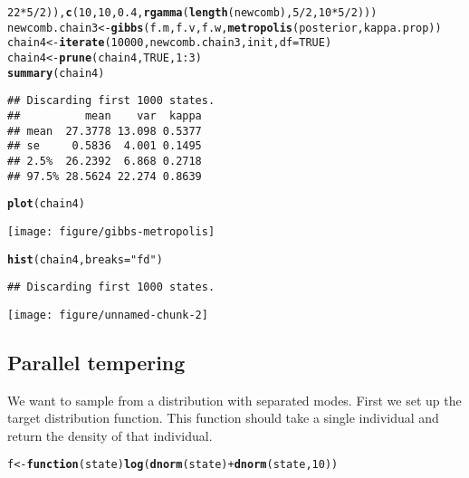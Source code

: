 \documentclass{article}\usepackage[]{graphicx}\usepackage[]{color}
\makeatletter
\def\maxwidth{ %
  \ifdim\Gin@nat@width>\linewidth
    \linewidth
  \else
    \Gin@nat@width
  \fi
}
\newcommand{\hlnum}[1]{\textcolor[rgb]{0.686,0.059,0.569}{#1}}%
\newcommand{\hlstr}[1]{\textcolor[rgb]{0.192,0.494,0.8}{#1}}%
\newcommand{\hlopt}[1]{\textcolor[rgb]{0,0,0}{#1}}%
\newcommand{\hlstd}[1]{\textcolor[rgb]{0.345,0.345,0.345}{#1}}%
\newcommand{\hlkwa}[1]{\textcolor[rgb]{0.161,0.373,0.58}{\textbf{#1}}}%
\newcommand{\hlkwb}[1]{\textcolor[rgb]{0.69,0.353,0.396}{#1}}%
\newcommand{\hlkwc}[1]{\textcolor[rgb]{0.333,0.667,0.333}{#1}}%
\newcommand{\hlkwd}[1]{\textcolor[rgb]{0.737,0.353,0.396}{\textbf{#1}}}%
\newenvironment{kframe}{%
 \def\at@end@of@kframe{}%
 \ifinner\ifhmode%
  \def\at@end@of@kframe{\end{minipage}}%
  \begin{minipage}{\columnwidth}%
 \fi\fi%
 \def\FrameCommand##1{\hskip\@totalleftmargin \hskip-\fboxsep
 \colorbox{shadecolor}{##1}\hskip-\fboxsep
     \hskip-\linewidth \hskip-\@totalleftmargin \hskip\columnwidth}%
 \MakeFramed {\advance\hsize-\width
   \@totalleftmargin\z@ \linewidth\hsize
   \@setminipage}}%
 {\par\unskip\endMakeFramed%
 \at@end@of@kframe}
\newenvironment{knitrout}{}{} %
\makeatother
\begin{document}
\begin{knitrout}
\begin{kframe}
\begin{alltt}
    \hlnum{22} \hlopt{*} \hlnum{5}\hlopt{/}\hlnum{2}\hlstd{)),} \hlkwd{c}\hlstd{(}\hlnum{10}\hlstd{,} \hlnum{10}\hlstd{,} \hlnum{0.4}\hlstd{,} \hlkwd{rgamma}\hlstd{(}\hlkwd{length}\hlstd{(newcomb),} \hlnum{5}\hlopt{/}\hlnum{2}\hlstd{,} \hlnum{10} \hlopt{*} \hlnum{5}\hlopt{/}\hlnum{2}\hlstd{)))}
\hlstd{newcomb.chain3} \hlkwb{<-} \hlkwd{gibbs}\hlstd{(f.m, f.v, f.w,} \hlkwd{metropolis}\hlstd{(posterior, kappa.prop))}
\hlstd{chain4} \hlkwb{<-} \hlkwd{iterate}\hlstd{(}\hlnum{10000}\hlstd{, newcomb.chain3, init,} \hlkwc{df} \hlstd{=} \hlnum{TRUE}\hlstd{)}
\hlstd{chain4} \hlkwb{<-} \hlkwd{prune}\hlstd{(chain4,} \hlnum{TRUE}\hlstd{,} \hlnum{1}\hlopt{:}\hlnum{3}\hlstd{)}
\hlkwd{summary}\hlstd{(chain4)}
\end{alltt}
\begin{verbatim}
## Discarding first 1000 states.
##          mean    var  kappa
## mean  27.3778 13.098 0.5377
## se     0.5836  4.001 0.1495
## 2.5%  26.2392  6.868 0.2718
## 97.5% 28.5624 22.274 0.8639
\end{verbatim}
\begin{alltt}
\hlkwd{plot}\hlstd{(chain4)}
\end{alltt}
\end{kframe}
\texttt{[image: figure/gibbs-metropolis]} 

\end{knitrout}

\begin{knitrout}
\color{fgcolor}\begin{kframe}
\begin{alltt}
\hlkwd{hist}\hlstd{(chain4,} \hlkwc{breaks} \hlstd{=} \hlstr{"fd"}\hlstd{)}
\end{alltt}
\begin{verbatim}
## Discarding first 1000 states.
\end{verbatim}
\end{kframe}
\texttt{[image: figure/unnamed-chunk-2]} 

\end{knitrout}


\subsection{Parallel tempering}
We want to sample from a distribution with separated modes.  First we
set up the target distribution function. This function should take a
single individual and return the density of that individual.
\begin{knitrout}
\color{fgcolor}\begin{kframe}
\begin{alltt}
\hlstd{f} \hlkwb{<-} \hlkwa{function}\hlstd{(}\hlkwc{state}\hlstd{)} \hlkwd{log}\hlstd{(}\hlkwd{dnorm}\hlstd{(state)} \hlopt{+} \hlkwd{dnorm}\hlstd{(state,} \hlnum{10}\hlstd{))}
\end{alltt}
\end{kframe}
\end{knitrout}
\end{document}

